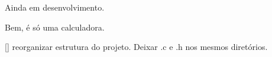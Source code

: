 Ainda em desenvolvimento.

Bem, é só uma calculadora.

\mbox{[}\mbox{]} reorganizar estrutura do projeto. Deixar {\ttfamily .c} e {\ttfamily .h} nos mesmos diretórios. 